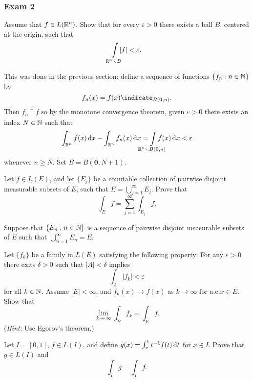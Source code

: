 \subsubsection{Exam 2}
\setcounter{exercise}{0}
\setcounter{equation}{0}

\begin{problem}
  Assume that \(f\in L(\mathbb{R}^n)\). Show that for every \(\varepsilon>0\)
  there exists a ball \(B\), centered at the origin, such that
  \[
    \int\limsclap{\bbR^n\setminus B}|f|<\varepsilon.
  \]
\end{problem}
\begin{solution}
  This was done in the previous section: define a sequence of functions
  \(\{f_n:n\in\mathbb{N}\}\) by
  \[
    f_n(x)=f(x)\indicate_{B(\mathbf{0},n)}.
  \]
  Then \(f_n\uparrow f\) so by the monotone convergence theorem, given
  \(\varepsilon>0\) there exists an index \(N\in\mathbb{N}\) such that
  \[
    \int_{\bbR^n}f(x)\diff x-\int_{\bbR^n}f_n(x)\diff
    x=\int\limsclap{\bbR^n\setminus B(\mathbf{0},n)} f(x)\diff x<\varepsilon
  \]
  whenever \(n\geq N\). Set \(B=B(\mathbf{0},N+1)\).
\end{solution}

\begin{problem}
  Let \(f\in L(E)\), and let \(\{E_j\}\) be a countable collection of
  pairwise disjoint measurable subsets of \(E\), such that
  \(E=\bigcup_{j=1}^\infty E_j\). Prove that
  \[
    \int_E f=\sum_{j=1}^\infty\int_{E_j}f.
  \]
\end{problem}
\begin{solution}
  Suppose that \(\{E_n:n\in\mathbb{N}\}\) is a sequence of pairwise disjoint
  measurable subsets of \(E\) such that \(\bigcup_{n=1}^\infty E_n=E\).
\end{solution}

\begin{problem}
  Let \(\{f_k\}\) be a family in \(L(E)\) satisfying the following
  property: For any \(\varepsilon>0\) there exits \(\delta>0\) such that
  \(|A|<\delta\) implies
  \[
    \int_A |f_k|<\varepsilon
  \]
  for all \(k\in\mathbb{N}\). Assume \(|E|<\infty\), and \(f_k(x)\to f(x)\) as
  \(k\to\infty\) for a.e.\@ \(x\in E\). Show that
  \[
    \lim_{k\to\infty}\int_E f_k=\int_E f.
  \]
  (\emph{Hint:} Use Egorov's theorem.)
\end{problem}
\begin{solution}
\end{solution}

\begin{problem}
  Let \(I=[0,1]\), \(f\in L(I)\), and define
  \(g(x)=\int_x^1 t^{-1}f(t) \mathop{}\!\mathrm{d} t\) for \(x\in I\). Prove that
  \(g\in L(I)\) and
  \[
    \int_I g=\int_I f.
  \]
\end{problem}
\begin{solution}
\end{solution}

